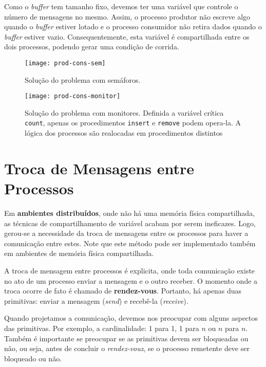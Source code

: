 Como o \textit{buffer} tem tamanho fixo, devemos ter uma variável que controle o número de mensagens no mesmo. Assim, o processo produtor não escreve algo quando o \textit{buffer} estiver lotado e o processo consumidor não retira dados quando o \textit{buffer} estiver vazio. Consequentemente, esta variável é compartilhada entre os dois processos, podendo gerar uma condição de corrida.

\begin{figure}[H]
  \centering
  \texttt{[image: prod-cons-sem]}
  \caption{Solução do problema com semáforos.}
  \label{fig:prod-cons-sem}
\end{figure}


\begin{figure}[H]
  \centering
  \texttt{[image: prod-cons-monitor]}
  \caption{Solução do problema com monitores. Definida a variável crítica \texttt{count}, apenas os procedimentos \texttt{insert} e \texttt{remove} podem opera-la. A lógica dos processos são realocadas em procedimentos distintos}
  \label{fig:prod-cons-monitor}
\end{figure}









\section{Troca de Mensagens entre Processos}
Em \textbf{ambientes distribuídos}, onde não há uma memória física compartilhada, as técnicas de compartilhamento de variável acabam por serem ineficazes. Logo, gerou-se a necessidade da troca de mensagens entre os processos para haver a comunicação entre estes. Note que este método pode ser implementado também em ambientes de memória física compartilhada.

A troca de mensagem entre processos é explicita, onde toda comunicação existe no ato de um processo enviar a mensagem e o outro receber. O momento onde a troca ocorre de fato é chamado de \textbf{rendez-vous}. Portanto, há apenas duas primitivas: enviar a mensagem (\textit{send}) e recebê-la (\textit{receive}).

Quando projetamos a comunicação, devemos nos preocupar com alguns aspectos das primitivas. Por exemplo, a cardinalidade: 1 para 1, 1 para $n$ ou $n$ para $n$. Também é importante se preocupar se as primitivas devem ser bloqueadas ou não, ou seja, antes de concluir o \textit{rendez-vouz}, se o processo remetente deve ser bloqueado ou não.

